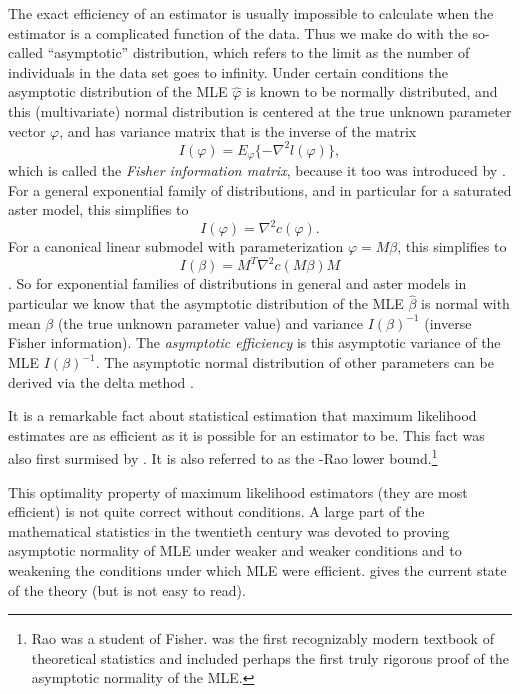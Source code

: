 \documentclass[11pt]{article}
\begin{document}
The exact efficiency of an estimator is usually impossible to calculate
when the estimator is a complicated function of the data.  Thus we make
do with the so-called ``asymptotic'' distribution, which refers to the limit
as the number of individuals in the data set goes to infinity.
Under certain conditions the asymptotic distribution of the MLE $\hat{\varphi}$
is known to be normally distributed,
and this (multivariate) normal distribution is centered
at the true unknown parameter vector $\varphi$, and has variance matrix that
is the inverse of the matrix
$$
   I(\varphi) = E_\varphi\{ - \nabla^2 l(\varphi) \},
$$
which is called the \emph{Fisher information matrix}, because it too was
introduced by \citet{fisher1922}.
For a general exponential family of distributions, and in particular for
a saturated aster model, this simplifies to
$$
   I(\varphi) = \nabla^2 c(\varphi).
$$
For a canonical linear submodel with parameterization $\varphi = M \beta$,
this simplifies to
\begin{equation} \label{eq:fisher-information}
   I(\beta) = M^T \nabla^2 c(M \beta) M
\end{equation}
\citep[Section~3.2]{aster1}.
So for exponential families of distributions in general and aster models
in particular we know that the asymptotic distribution of the MLE
$\hat{\beta}$ is normal with mean $\beta$ (the true unknown parameter value)
and variance $I(\beta)^{-1}$ (inverse Fisher information).
The \emph{asymptotic efficiency} is this asymptotic variance of the MLE
$I(\beta)^{-1}$.  The asymptotic normal distribution of other parameters
can be derived via the delta method \citet[Section~3.3]{aster1}.

It is a remarkable fact about statistical estimation that maximum likelihood
estimates are as efficient as it is possible for an estimator to be.  This
fact was also first surmised by \citet{fisher1922}.  It is also referred to as
the \citeauthor{cramer}-Rao lower bound.\footnote{Rao was a student of Fisher.
\citet{cramer} was the first recognizably modern textbook of theoretical
statistics and included perhaps the first truly rigorous proof of the
asymptotic normality of the MLE.}

This optimality
property of maximum likelihood estimators (they are most efficient) is not
quite correct without conditions.  A large part of the mathematical statistics
in the twentieth century was devoted to proving asymptotic normality of MLE
under weaker and weaker conditions and to weakening the conditions under
which MLE were efficient.  gives
the current state of the theory (but is not easy to read).
\end{document}
